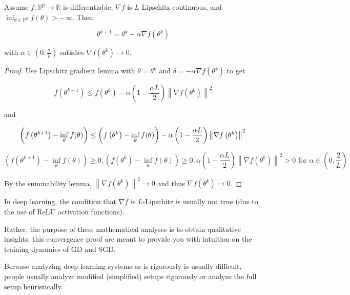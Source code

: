 \documentclass{report}
\begin{document}
\begin{theorem}[2.6][Convergence of GD]
    Assume $f: \mathbb{R}^{p} \rightarrow \mathbb{R}$ is differentiable, $\nabla f$ is $L$-Lipschitz continuous, and $\inf _{\theta \in \mathbb{R}^{p}} f(\theta)>-\infty$. Then

    $$
    \theta^{k+1}=\theta^{k}-\alpha \nabla f\left(\theta^{k}\right)
    $$

    with $\alpha \in\left(0, \frac{2}{L}\right)$ satisfies $\nabla f\left(\theta^{k}\right) \rightarrow 0$.

    \begin{proof}
        Use Lipschitz gradient lemma with $\theta=\theta^{k}$ and $\delta=-\alpha \nabla f\left(\theta^{k}\right)$ to get

        $$
        f\left(\theta^{k+1}\right) \leq f\left(\theta^{k}\right)-\alpha\left(1-\frac{\alpha L}{2}\right)\left\|\nabla f\left(\theta^{k}\right)\right\|^{2}
        $$

        and

        $$
        \left(f\left(\theta^{k+1}\right)-\inf _{\theta} f(\theta)\right) \leq\left(f\left(\theta^{k}\right)-\inf _{\theta} f(\theta)\right)-\alpha\left(1-\frac{\alpha L}{2}\right)\left\|\nabla f\left(\theta^{k}\right)\right\|^{2} \\
        $$

        $$
        \left(f\left(\theta^{k+1}\right)-\inf _{\theta} f(\theta)\right) \ge 0, 
        \left(f\left(\theta^{k}\right)-\inf _{\theta} f(\theta)\right) \ge 0, 
        \alpha\left(1-\frac{\alpha L}{2}\right)\left\|\nabla f\left(\theta^{k}\right)\right\|^{2} > 0 \text{ for } \alpha \in\left(0, \frac{2}{L}\right)
        $$

        By the summability lemma, $\left\|\nabla f\left(\theta^{k}\right)\right\|^{2} \rightarrow 0$ and thus $\nabla f\left(\theta^{k}\right) \rightarrow 0$.
    \end{proof}
\end{theorem}

In deep learning, the condition that $\nabla f$ is $L$-Lipschitz is usually not true (due to the use of ReLU activation functions).

Rather, the purpose of these mathematical analyses is to obtain qualitative insights; this convergence proof are meant to provide you with intuition on the training dynamics of GD and SGD.

Because analyzing deep learning systems as is rigorously is usually difficult, people usually analyze modified (simplified) setups rigorously or analyze the full setup heuristically.
\end{document}

